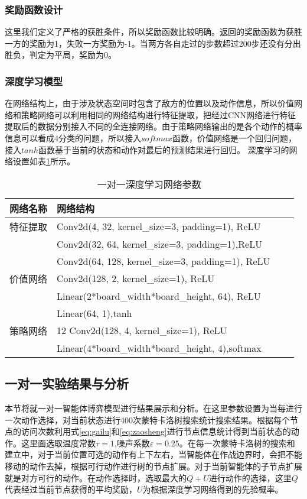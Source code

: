\subsubsection{奖励函数设计}
这里我们定义了严格的获胜条件，所以奖励函数比较明确。返回的奖励函数为获胜一方的奖励为1，失败一方奖励为-1。当两方各自走过的步数超过200步还没有分出胜负，判定为平局，奖励为0。
\subsubsection{深度学习模型}
在网络结构上，由于涉及状态空间时包含了敌方的位置以及动作信息，所以价值网络和策略网络可以利用相同的网络结构进行特征提取，把经过CNN网络进行特征提取后的数据分别接入不同的全连接网络。由于策略网络输出的是各个动作的概率信息可以看成4分类的问题，所以接入$softmax$函数，价值网络是一个回归问题，接入$tanh$函数基于当前的状态和动作对最后的预测结果进行回归。
深度学习的网络设置如表\ref{tab4}所示。
\begin{table}[!h]
	\centering
	\caption{一对一深度学习网络参数}
	\label{tab4}
	\begin{tabular}{llll} \toprule
		网络名称   & 网络结构  \\  \midrule
		特征提取 &	Conv2d(4, 32, kernel\_size=3, padding=1), ReLU\\
		&	Conv2d(32, 64, kernel\_size=3, padding=1),ReLU\\
		&	Conv2d(64, 128, kernel\_size=3, padding=1), ReLU\\
		价值网络&Conv2d(128, 2, kernel\_size=1), ReLU\\
		&Linear(2*board\_width*board\_height, 64), ReLU\\
		&Linear(64, 1),tanh\\
		策略网络&12 Conv2d(128, 4, kernel\_size=1), ReLU\\
		&Linear(4*board\_width*board\_height,
		4),softmax\\
		
		\bottomrule
	\end{tabular}
\end{table}


\subsection{一对一实验结果与分析}
本节将就一对一智能体博弈模型进行结果展示和分析。在这里参数设置为当每进行一次动作选择，对当前状态进行400次蒙特卡洛树搜索统计搜索结果。根据每个节点的访问次数利用式\ref{eq:gailu}和\ref{eq:zaosheng}进行节点信息统计得到当前状态的动作。这里面选取温度常数$\tau=1$,噪声系数$\varepsilon=0.25$。在每一次蒙特卡洛树的搜索和建立中，对于当前位置可选的动作有上下左右，当智能体在作战边界时，会把不能移动的动作去掉，根据可行动作进行树的节点扩展。对于当前智能体的子节点扩展就是对方可行的动作。在动作选择时，选取最大的$Q+U$进行动作的选择，这里$Q$代表经过当前节点获得的平均奖励，$U$为根据深度学习网络得到的先验概率。


